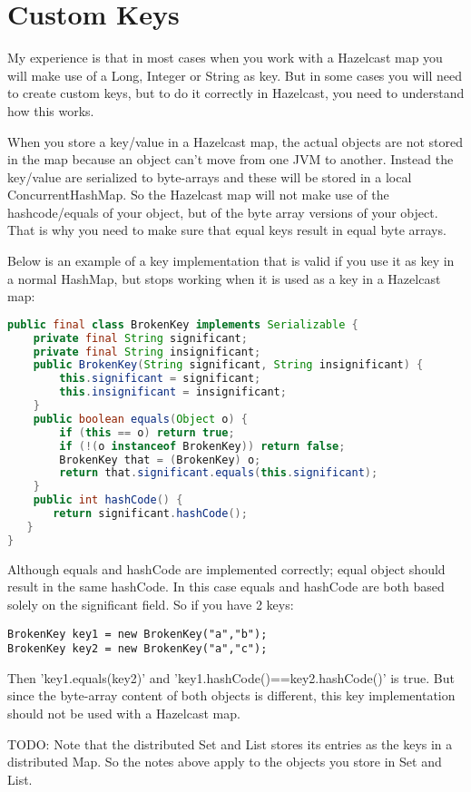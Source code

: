\section{Custom Keys}
My experience is that in most cases when you work with a Hazelcast map you will make use of a Long, Integer or String as key. But in some cases you will need to create custom keys, but to do it correctly in Hazelcast, you need to understand how this works. 

When you store a key/value in a Hazelcast map, the actual objects are not stored in the map because an object can't move from one JVM to another. Instead the key/value are serialized to byte-arrays and these will be stored in a local ConcurrentHashMap. So the Hazelcast map will not make use of the hashcode/equals of your object, but of the byte array versions of your object. That is why you need to make sure that equal keys result in equal byte arrays. 

Below is an example of a key implementation that is valid if you use it as key in a normal HashMap, but stops working when it is used as a key in a Hazelcast map:
\begin{lstlisting}[language=java]
public final class BrokenKey implements Serializable {
    private final String significant;
    private final String insignificant;
    public BrokenKey(String significant, String insignificant) {
        this.significant = significant;
        this.insignificant = insignificant;
    }
    public boolean equals(Object o) {
        if (this == o) return true;
        if (!(o instanceof BrokenKey)) return false;
        BrokenKey that = (BrokenKey) o;
        return that.significant.equals(this.significant);
    }
    public int hashCode() {
       return significant.hashCode();
   }
}
\end{lstlisting}
Although equals and hashCode are implemented correctly; equal object should result in the same hashCode. In this case equals and hashCode are both based solely on the significant field. So if you have 2 keys:
\begin{verbatim}
BrokenKey key1 = new BrokenKey("a","b");
BrokenKey key2 = new BrokenKey("a","c");
\end{verbatim} 
Then 'key1.equals(key2)' and 'key1.hashCode()==key2.hashCode()' is true. But since the byte-array content of both objects is different, this key implementation should not be used with a Hazelcast map.

TODO:
Note that the distributed Set and List stores its entries as the keys in a distributed Map. So the notes above apply to the objects you store in Set and List.

